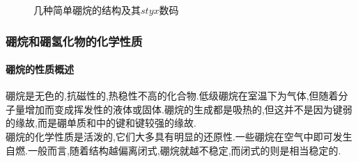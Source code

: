 \documentclass{ctexart}
\begin{document}
\begin{figure}[H]
    \caption{几种简单硼烷的结构及其$styx$数码}
\end{figure}
\subsubsection{硼烷和硼氢化物的化学性质}
\paragraph{硼烷的性质概述}
硼烷是无色的,抗磁性的,热稳性不高的化合物.低级硼烷在室温下为气体,但随着分子量增加而变成挥发性的液体或固体.硼烷的生成都是吸热的,但这并不是因为键弱的缘故,而是硼单质和中的键和键较强的缘故.\\
\indent 硼烷的化学性质是活泼的,它们大多具有明显的还原性.一些硼烷在空气中即可发生自燃.一般而言,随着结构越偏离闭式,硼烷就越不稳定,而闭式的则是相当稳定的.
\end{document}
